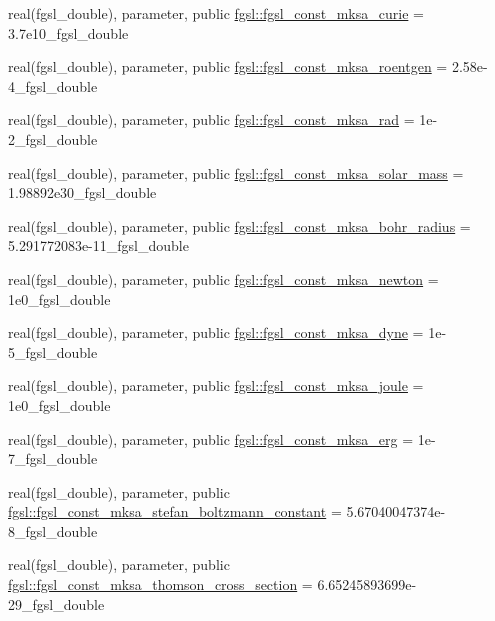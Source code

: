 \begin{DoxyCompactItemize}
\item 
real(fgsl\+\_\+double), parameter, public \hyperlink{namespacefgsl_a96bbfcd3e0e6a9190e86a1a909b7407b}{fgsl\+::fgsl\+\_\+const\+\_\+mksa\+\_\+curie} = 3.\+7e10\+\_\+fgsl\+\_\+double
\item 
real(fgsl\+\_\+double), parameter, public \hyperlink{namespacefgsl_a0b3f21e2d3493c6d7662dbe77ab1fbe6}{fgsl\+::fgsl\+\_\+const\+\_\+mksa\+\_\+roentgen} = 2.\+58e-\/4\+\_\+fgsl\+\_\+double
\item 
real(fgsl\+\_\+double), parameter, public \hyperlink{namespacefgsl_a46fbda29caeb0f9c75253f461d340353}{fgsl\+::fgsl\+\_\+const\+\_\+mksa\+\_\+rad} = 1e-\/2\+\_\+fgsl\+\_\+double
\item 
real(fgsl\+\_\+double), parameter, public \hyperlink{namespacefgsl_accd84d0687faa8d8009cb69525c2c81d}{fgsl\+::fgsl\+\_\+const\+\_\+mksa\+\_\+solar\+\_\+mass} = 1.\+98892e30\+\_\+fgsl\+\_\+double
\item 
real(fgsl\+\_\+double), parameter, public \hyperlink{namespacefgsl_a52a0f9900118e47b537d0ee98ba88780}{fgsl\+::fgsl\+\_\+const\+\_\+mksa\+\_\+bohr\+\_\+radius} = 5.\+291772083e-\/11\+\_\+fgsl\+\_\+double
\item 
real(fgsl\+\_\+double), parameter, public \hyperlink{namespacefgsl_a502e10d884393483a5f705039802ef9f}{fgsl\+::fgsl\+\_\+const\+\_\+mksa\+\_\+newton} = 1e0\+\_\+fgsl\+\_\+double
\item 
real(fgsl\+\_\+double), parameter, public \hyperlink{namespacefgsl_a17365a3e64a2dd83aea9ebba6757fd7b}{fgsl\+::fgsl\+\_\+const\+\_\+mksa\+\_\+dyne} = 1e-\/5\+\_\+fgsl\+\_\+double
\item 
real(fgsl\+\_\+double), parameter, public \hyperlink{namespacefgsl_a2bb10acb778e8412e7c0bc7e7f95787b}{fgsl\+::fgsl\+\_\+const\+\_\+mksa\+\_\+joule} = 1e0\+\_\+fgsl\+\_\+double
\item 
real(fgsl\+\_\+double), parameter, public \hyperlink{namespacefgsl_a7135370afba011fa6c30a3028af76f15}{fgsl\+::fgsl\+\_\+const\+\_\+mksa\+\_\+erg} = 1e-\/7\+\_\+fgsl\+\_\+double
\item 
real(fgsl\+\_\+double), parameter, public \hyperlink{namespacefgsl_a730c5b5646585a81247eaa92703505da}{fgsl\+::fgsl\+\_\+const\+\_\+mksa\+\_\+stefan\+\_\+boltzmann\+\_\+constant} = 5.\+67040047374e-\/8\+\_\+fgsl\+\_\+double
\item 
real(fgsl\+\_\+double), parameter, public \hyperlink{namespacefgsl_a6db1579c2961f86ba36e1ec23eea34cf}{fgsl\+::fgsl\+\_\+const\+\_\+mksa\+\_\+thomson\+\_\+cross\+\_\+section} = 6.\+65245893699e-\/29\+\_\+fgsl\+\_\+double

\end{DoxyCompactItemize}
